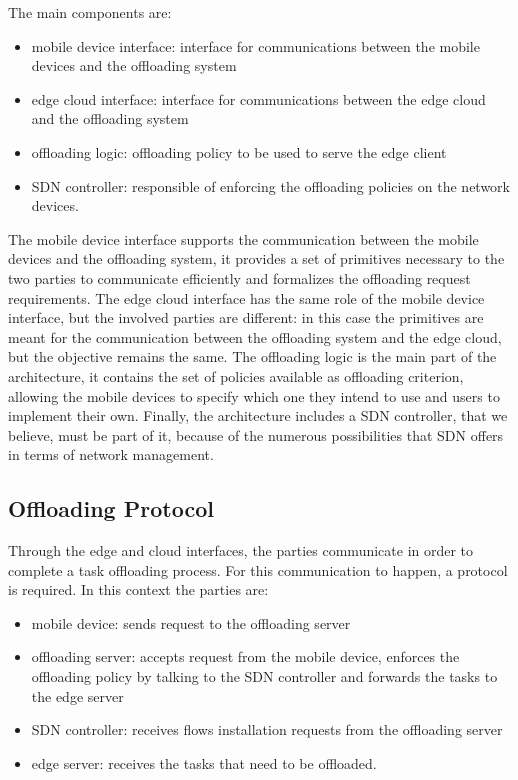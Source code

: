 The main components are:
\begin{itemize}
\item mobile device interface: interface for communications between the mobile devices and the offloading system
\item edge cloud interface: interface for communications between the edge cloud and the offloading system
\item offloading logic: offloading policy to be used to serve the edge client
\item SDN controller: responsible of enforcing the offloading policies on the network devices.
\end{itemize}

The mobile device interface supports the communication between the mobile devices and the offloading system, it provides a set of primitives necessary to the two parties to communicate efficiently and formalizes the offloading request requirements. The edge cloud interface has the same role of the mobile device interface, but the involved parties are different: in this case the primitives are meant for the communication between the offloading system and the edge cloud, but the objective remains the same. The offloading logic is the main part of the architecture, it contains the set of policies available as offloading criterion, allowing the mobile devices to specify which one they intend to use and users to implement their own. Finally, the architecture includes a SDN controller, that we believe, must be part of it, because of the numerous possibilities that SDN offers in terms of network management.  

\subsection{Offloading Protocol}
Through the edge and cloud interfaces, the parties communicate in order to complete a task offloading process. For this communication to happen, a protocol is required. In this context the parties are:
\begin{itemize}
    \item mobile device: sends request to the offloading server
    \item offloading server: accepts request from the mobile device, enforces the offloading policy by talking to the SDN controller and forwards the tasks to the edge server
    \item SDN controller: receives flows installation requests from the offloading server
    \item edge server: receives the tasks that need to be offloaded.
\end{itemize}

